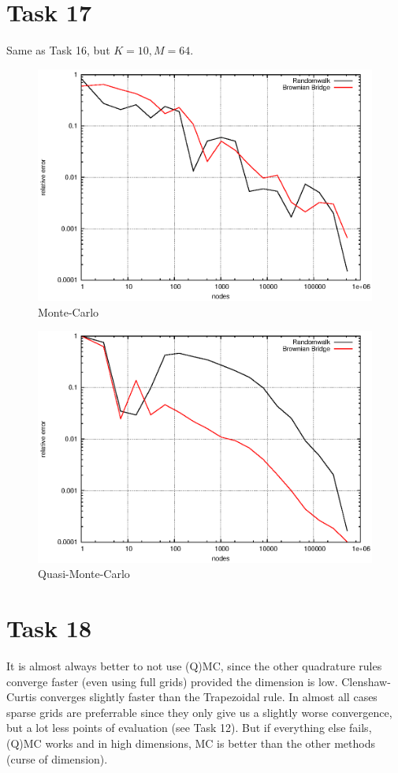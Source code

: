 \documentclass[]{article}
\begin{document}
\section*{Task 17}
Same as Task 16, but $K=10,M=64$.
\begin{figure}[!ht]
\centering
\includegraphics{task17_mc}
\caption{Monte-Carlo}
\label{fig:Task17a}
\end{figure}

\begin{figure}[!ht]
\centering
\includegraphics{task17_qmc}
\caption{Quasi-Monte-Carlo}
\label{fig:Task17b}
\end{figure}
\clearpage

\section*{Task 18} It is almost always better to not use (Q)MC, since the other
quadrature rules converge faster (even using full grids) provided the dimension is low. Clenshaw-Curtis
converges slightly faster than the Trapezoidal rule. In almost all cases sparse
grids are preferrable since they only give us a slightly worse convergence, but
a lot less points of evaluation (see Task 12). But if everything else fails, (Q)MC
works and in high dimensions, MC is better than the other methods (curse of dimension).
\end{document}
